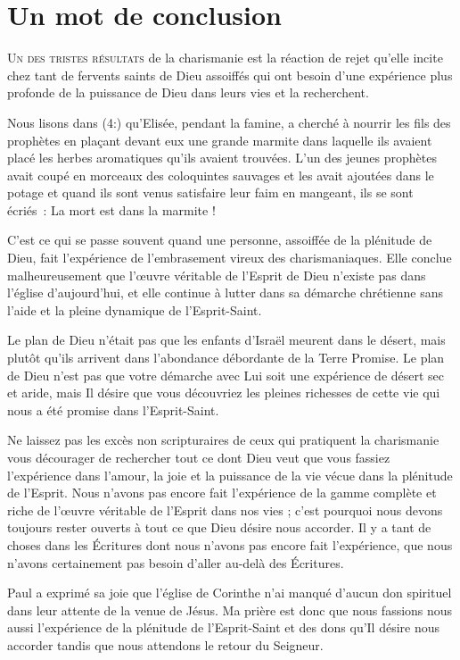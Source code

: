 \chapter{Un mot de conclusion}

\lettrine{U}{n des tristes résultats} de la charismanie est la réaction de rejet
 qu'elle incite chez tant de fervents saints de Dieu assoiffés
 qui ont besoin d'une expérience plus profonde de la puissance de Dieu
 dans leurs vies et la recherchent.

Nous lisons dans (4:) qu'Elisée, pendant la famine,
 a cherché à nourrir les fils des prophètes en plaçant devant eux
 une grande marmite dans laquelle ils avaient placé les herbes
 aromatiques qu'ils avaient trouvées.
 L'un des jeunes prophètes avait coupé en morceaux des coloquintes
 sauvages et les avait ajoutées dans le potage et quand ils sont venus
 satisfaire leur faim en mangeant, ils se sont écriés~:
 \og La mort est dans la marmite ! \fg{}

C'est ce qui se passe souvent quand une personne,
 assoiffée de la plénitude de Dieu, fait l'expérience de l'embrasement
 vireux des charismaniaques. Elle conclue malheureusement
 que l'œuvre véritable de l'Esprit de Dieu n'existe pas
 dans l'église d'aujourd'hui, et elle continue à lutter
 dans sa démarche chrétienne sans l'aide et la pleine dynamique
 de l'Esprit-Saint.

Le plan de Dieu n'était pas que les enfants d'Israël meurent
 dans le désert, mais plutôt qu'ils arrivent dans l'abondance débordante
 de la Terre Promise. Le plan de Dieu n'est pas que votre démarche
 avec Lui soit une expérience de désert sec et aride, mais Il désire
 que vous découvriez les pleines richesses de cette vie
 qui nous a été promise dans l'Esprit-Saint.

Ne laissez pas les excès non scripturaires de ceux qui pratiquent 
la charismanie vous décourager de rechercher tout ce dont Dieu
 veut que vous fassiez l'expérience dans l'amour,
 la joie et la puissance de la vie vécue dans la plénitude de l'Esprit.
 Nous n'avons pas encore fait l'expérience de la gamme complète
 et riche de l'œuvre véritable de l'Esprit dans nos vies ;
 c'est pourquoi nous devons toujours rester ouverts
 à tout ce que Dieu désire nous accorder.
 Il y a tant de choses dans les Écritures dont nous n'avons pas encore
 fait l'expérience, que nous n'avons certainement pas besoin
 d'aller au-delà des Écritures.

\begin{specialpar}{}
Paul a exprimé sa joie que l'église de Corinthe n'ai manqué
 d'aucun don spirituel dans leur attente de la venue de Jésus.
 Ma prière est donc que nous fassions nous aussi l'expérience
 de la plénitude de l'Esprit-Saint et des dons qu'Il désire
 nous accorder tandis que nous attendons le retour du Seigneur.
\end{specialpar}
\closechapter


